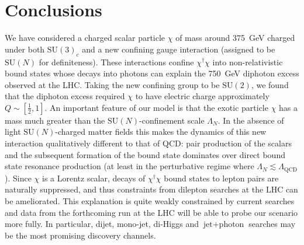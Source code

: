 \section{Conclusions}

We have considered a charged scalar particle $\chi$ of mass around
\SI{375}{\GeV} charged under both $\mathrm{SU}(3)_{c}$ and a new confining gauge
interaction (assigned to be $\mathrm{SU}(N)$ for definiteness). These
interactions confine $\chi^\dagger\chi$ into non-relativistic bound states whose
decays into photons can explain the \SI{750}{\GeV} diphoton excess observed at
the LHC. Taking the new confining group to be $\mathrm{SU}(2)$, we found that
the diphoton excess required $\chi$ to have electric charge approximately
$Q \sim [\frac{1}{2}, 1]$. An important feature of our model is that the exotic
particle $\chi$ has a mass much greater than the $\mathrm{SU}(N)$-confinement
scale $\Lambda_{N}$. In the absence of light $\mathrm{SU}(N)$-charged matter
fields this makes the dynamics of this new interaction qualitatively different
to that of QCD: pair production of the scalars and the subsequent formation of
the bound state dominates over direct bound state resonance production (at least
in the perturbative regime where $\Lambda_{N} \lesssim \Lambda_{\text{QCD}}$).
Since $\chi$ is a Lorentz scalar, decays of $\chi^\dagger \chi$ bound states to
lepton pairs are naturally suppressed, and thus constraints from dilepton
searches at the LHC can be ameliorated. This explanation is quite weakly
constrained by current searches and data from the forthcoming run at the LHC
will be able to probe our scenario more fully. In particular, dijet, mono-jet,
di-Higgs and $\text{jet} + \text{photon}$ searches may be the most promising
discovery channels.
